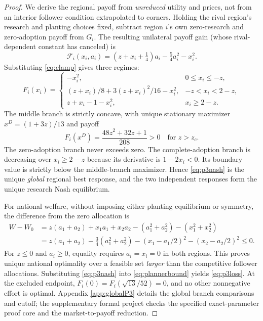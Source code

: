 \documentclass[USenglish]{article}
\begin{document}
\begin{proof}
We derive the regional payoff from \emph{unreduced} utility and prices, not from an interior follower condition extrapolated to corners. Holding the rival region's research and planting choices fixed, subtract region $i$'s own zero-research and zero-adoption payoff from $G_i$. The resulting unilateral payoff gain (whose rival-dependent constant has canceled) is
\begin{equation}
 \mathcal F_i(x_i,a_i)
 =(z+x_i+\tfrac14)a_i-\tfrac54a_i^2-x_i^2.
 \label{eq:offpathpayoff}
\end{equation}
Substituting \eqref{eq:clamp} gives three regimes:
\begin{equation}
 F_i(x_i)=
 \begin{cases}
 -x_i^2,&0\leq x_i\leq-z,\\[2pt]
 (z+x_i)/8+3(z+x_i)^2/16-x_i^2,&-z<x_i<2-z,\\[2pt]
 z+x_i-1-x_i^2,&x_i\geq2-z.
 \end{cases}
 \label{eq:threebranches}
\end{equation}
The middle branch is strictly concave, with unique stationary maximizer $x^D=(1+3z)/13$ and payoff
\[
 F_i(x^D)=\frac{48z^2+32z+1}{208}>0
 \quad\text{for }z>z_c.
\]
The zero-adoption branch never exceeds zero. The complete-adoption branch is decreasing over $x_i\geq2-z$ because its derivative is $1-2x_i<0$. Its boundary value is strictly below the middle-branch maximizer. Hence \eqref{eq:p3nash} is the unique \emph{global} regional best response, and the two independent responses form the unique research Nash equilibrium.

For national welfare, without imposing either planting equilibrium or symmetry, the difference from the zero allocation is
\begin{align}
 W-W_0
 &=z(a_1+a_2)+x_1a_1+x_2a_2
   -(a_1^2+a_2^2)-(x_1^2+x_2^2)\nonumber\\
 &=z(a_1+a_2)-\frac34(a_1^2+a_2^2)
   -(x_1-a_1/2)^2-(x_2-a_2/2)^2
 \leq0.
 \label{eq:plannerbound}
\end{align}
For $z\leq0$ and $a_i\geq0$, equality requires $a_i=x_i=0$ in both regions. This proves unique national optimality over a feasible set \emph{larger} than the competitive follower allocations. Substituting \eqref{eq:p3nash} into \eqref{eq:plannerbound} yields \eqref{eq:p3loss}. At the excluded endpoint, $F_i(0)=F_i(\sqrt{13}/52)=0$, and no other nonnegative effort is optimal. Appendix \ref{app:globalP3} details the global branch comparisons and cutoff; the supplementary formal project checks the specified exact-parameter proof core and the market-to-payoff reduction.
\end{proof}
\end{document}

